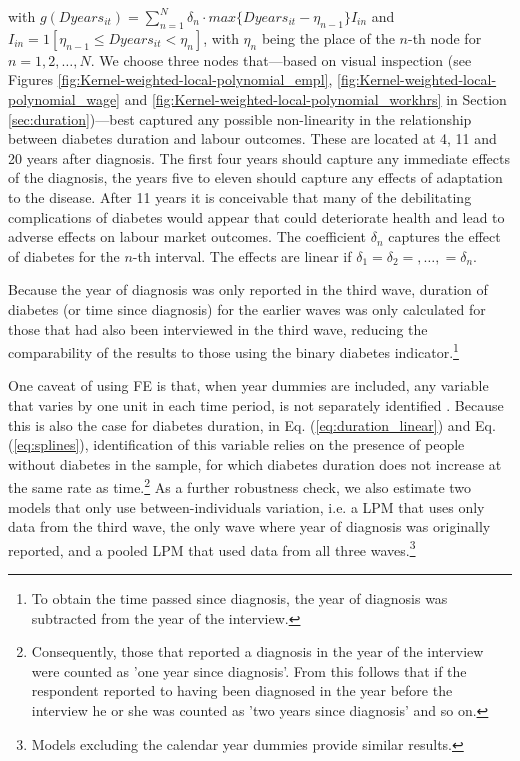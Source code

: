 \noindent with $g(Dyears_{it})=\sum_{n=1}^{N}\delta_{n}\cdot max\{Dyears_{it}-\eta_{n-1}\}I_{in}$ and $I_{in}=1[\eta_{n-1}\leq Dyears_{it}<\eta_{n}]$, with $\eta_{n}$ being the place of the $n$-th node for $n=1,2,\ldots,N$. We choose three nodes that---based on visual inspection (see Figures \ref{fig:Kernel-weighted-local-polynomial_empl}, \ref{fig:Kernel-weighted-local-polynomial_wage} and \ref{fig:Kernel-weighted-local-polynomial_workhrs} in Section \ref{sec:duration})---best captured any possible non-linearity in the
relationship between diabetes duration and labour outcomes. These are located at 4, 11 and 20 years after diagnosis. The
first four years should capture any immediate effects of the diagnosis, the years five to eleven should capture any effects of adaptation to the disease. After 11 years it is conceivable that many of the debilitating complications of diabetes would appear that could deteriorate health and lead to adverse effects on labour market outcomes. The coefficient $\delta_{n}$ captures the effect of diabetes for the $n$-th interval. The effects are linear if $\delta_{1}=\delta_{2}=,\ldots,=\delta_{n}$.

Because the year of diagnosis was only reported in the third wave, duration of diabetes (or time since diagnosis) for the earlier waves was only calculated for those that had also been interviewed in the third wave, reducing the comparability of the results to those using the binary diabetes indicator.\footnote{To obtain the time passed since diagnosis, the year of diagnosis was subtracted from the year of the interview.}

One caveat of using \ac{FE} is that, when year dummies are included, any variable that varies by one unit in each time period, is not separately identified \parencite{Wooldridge2012}. Because this is also the case for diabetes duration, in Eq. (\ref{eq:duration_linear}) and Eq. (\ref{eq:splines}), identification of this variable relies on the presence of people without diabetes in the sample, for which diabetes duration does not increase at the same rate as time.\footnote{Consequently, those that reported a diagnosis in the year of the interview were counted as 'one year since diagnosis'. From this follows that if the respondent reported to having been diagnosed in the year before the interview he or she was counted as 'two years since diagnosis' and so on.} As a further robustness check, we also estimate two models that only use between-individuals variation, i.e. a \ac{LPM} that uses only data from the third wave, the only wave where year of diagnosis was originally reported, and a pooled \ac{LPM} that used data from all three waves.\footnote{Models excluding the calendar year dummies provide similar results.}

